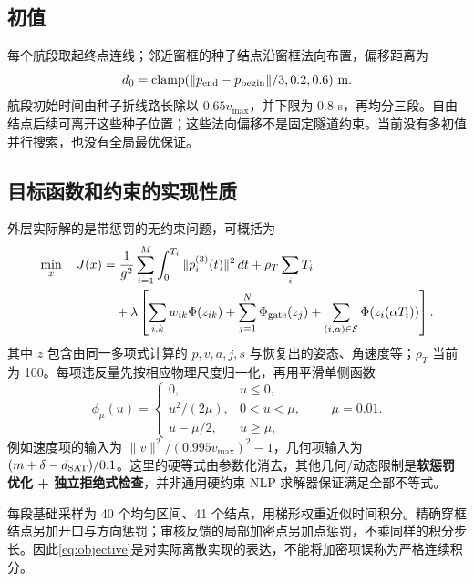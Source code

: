 \documentclass[UTF8,fontset=fandol,a4paper,10pt]{ctexart}
\begin{document}
\subsection{初值}
每个航段取起终点连线；邻近窗框的种子结点沿窗框法向布置，偏移距离为
\[
 d_0=\operatorname{clamp}(\|p_{\rm end}-p_{\rm begin}\|/3,0.2,0.6)\ \mathrm m.
\]
航段初始时间由种子折线路长除以 $0.65v_{\max}$，并下限为 0.8 s，再均分三段。自由结点后续可离开这些种子位置；这些法向偏移不是固定隧道约束。当前没有多初值并行搜索，也没有全局最优保证。

\subsection{目标函数和约束的实现性质}
外层实际解的是带惩罚的无约束问题，可概括为
\begin{align}
 \min_x\quad J(x)
 &=\frac{1}{g^2}\sum_{i=1}^{M}\int_0^{T_i}\|p_i^{(3)}(t)\|^2\,dt
   +\rho_T\sum_iT_i\nonumber\\
 &\quad+\lambda\left[\sum_{i,k}w_{ik}\Phi(z_{ik})
          +\sum_{j=1}^{N}\Phi_{\rm gate}(z_j)
          +\sum_{(i,\alpha)\in\mathcal E}\Phi(z_i(\alpha T_i))\right].\label{eq:objective}
\end{align}
其中 $z$ 包含由同一多项式计算的 $p,v,a,j,s$ 与恢复出的姿态、角速度等；$\rho_T$ 当前为 100。每项违反量先按相应物理尺度归一化，再用平滑单侧函数
\[
 \phi_\mu(u)=\begin{cases}
 0,&u\le0,\\u^2/(2\mu),&0<u<\mu,\\u-\mu/2,&u\ge\mu,
 \end{cases}\qquad\mu=0.01.
\]
例如速度项的输入为 $\|v\|^2/(0.995v_{\max})^2-1$，几何项输入为 $(m+\delta-d_{\rm SAT})/0.1$。这里的硬等式由参数化消去，其他几何/动态限制是\textbf{软惩罚优化 + 独立拒绝式检查}，并非通用硬约束 NLP 求解器保证满足全部不等式。

每段基础采样为 40 个均匀区间、41 个结点，用梯形权重近似时间积分。精确穿框结点另加开口与方向惩罚；审核反馈的局部加密点另加点惩罚，不乘同样的积分步长。因此\eqref{eq:objective}是对实际离散实现的表达，不能将加密项误称为严格连续积分。
\end{document}
